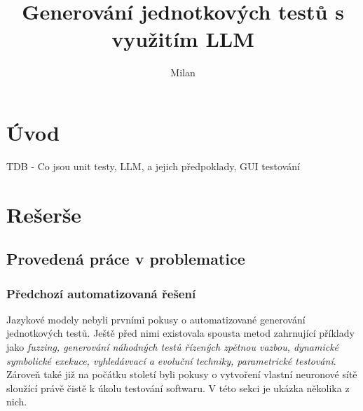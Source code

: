 \documentclass[czech, ma, kiv, he, iso690alph, pdf, viewonly]{fasthesis}
\title{Generování jednotkových testů s využitím LLM}
\author{Milan}{Horínek}{Bc.}{}
\begin{document}
\frontpages[tm] %
\tableofcontents
% 
%
\makeatletter%
\ifx\FASThesis@style\c@fullcolor%
\else%
\fi%
\makeatother%

\setlength{\parskip}{1em}


\chapter{Úvod}
TDB - Co jsou unit testy, LLM, a jejich předpoklady, GUI testování



\chapter{Rešerše}

    \section{Provedená práce v problematice} \label{sec:previouswork}
        \subsection{Předchozí automatizovaná řešení}
        Jazykové modely nebyli prvními pokusy o automatizované generování jednotkových testů. Ještě před nimi existovala spousta metod zahrnující příklady jako \textit{fuzzing, generování náhodných testů řízených zpětnou vazbou, dynamické symbolické exekuce, vyhledávvací a evoluční techniky, parametrické testování}. Zároveň také již na počátku století byli pokusy o vytvoření vlastní neuronové sítě sloužící právě čistě k úkolu testování softwaru. V této sekci je ukázka několika z nich. 
\end{document}
